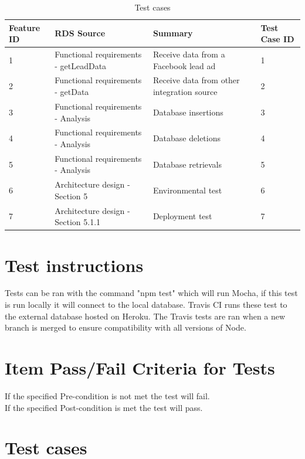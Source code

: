 \documentclass{article}
\begin{document}
\begin{table}[]
\centering
\caption{Test cases}
\label{test_table}
\begin{tabular}{|l|l|l|l|}
\hline
Feature ID & RDS Source                            & Summary                                    & Test Case ID \\ \hline \hline
1          & Functional requirements - getLeadData & Receive data from a Facebook lead ad       & 1            \\ \hline
2          & Functional requirements - getData     & Receive data from other integration source & 2            \\ \hline
3          & Functional requirements - Analysis    & Database insertions                        & 3            \\ \hline
4          & Functional requirements - Analysis    & Database deletions                         & 4            \\ \hline
5          & Functional requirements - Analysis    & Database retrievals                        & 5            \\ \hline
6          &  Architecture design - Section 5      & Environmental test                         & 6            \\ \hline
7          &  Architecture design - Section 5.1.1  & Deployment test                            & 7            \\ \hline
\end{tabular}
\end{table}


\section{Test instructions} 
Tests can be ran with the command "npm test" which will run Mocha, if this test is run locally it will connect to the local database.
Travis CI runs these test to the external database hosted on Heroku. The Travis tests are ran when a new branch is merged to ensure compatibility with all versions of Node.
\section{Item Pass/Fail Criteria for Tests}
If the specified Pre-condition is not met the test will fail. \\
If the specified Post-condition is met the test will pass.
\cleardoublepage
\section{Test cases}
\end{document}

